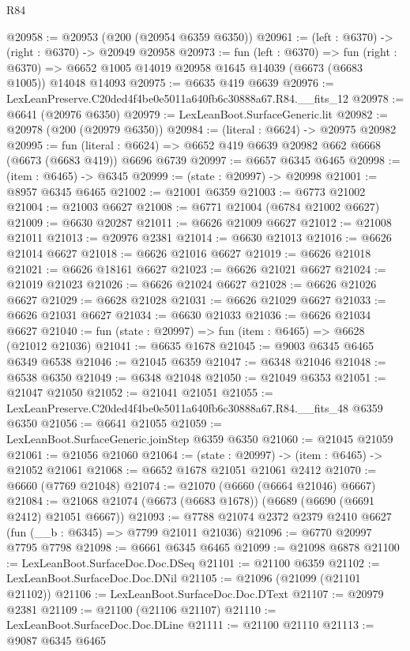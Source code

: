 \begin{lexlean}{R84}
\begin{coremodule}
@20958 := @20953 (@200 (@20954 @6359 @6350))
@20961 := (left : @6370) -> (right : @6370) -> @20949 @20958
@20973 := fun (left : @6370) =>
  fun (right : @6370) => @6652 @1005 @14019 @20958 @1645 @14039 (@6673 (@6683 @1005)) @14048 @14093
@20975 := @6635 @419 @6639
@20976 := LexLeanPreserve.C20ded4f4be0e5011a640fb6c30888a67.R84.__fits_12
@20978 := @6641 (@20976 @6350)
@20979 := LexLeanBoot.SurfaceGeneric.lit
@20982 := @20978 (@200 (@20979 @6350))
@20984 := (literal : @6624) -> @20975 @20982
@20995 := fun (literal : @6624) =>
  @6652 @419 @6639 @20982 @662 @6668 (@6673 (@6683 @419)) @6696 @6739
@20997 := @6657 @6345 @6465
@20998 := (item : @6465) -> @6345
@20999 := (state : @20997) -> @20998
@21001 := @8957 @6345 @6465
@21002 := @21001 @6359
@21003 := @6773 @21002
@21004 := @21003 @6627
@21008 := @6771 @21004 (@6784 @21002 @6627)
@21009 := @6630 @20287
@21011 := @6626 @21009 @6627
@21012 := @21008 @21011
@21013 := @20976 @2381
@21014 := @6630 @21013
@21016 := @6626 @21014 @6627
@21018 := @6626 @21016 @6627
@21019 := @6626 @21018
@21021 := @6626 @18161 @6627
@21023 := @6626 @21021 @6627
@21024 := @21019 @21023
@21026 := @6626 @21024 @6627
@21028 := @6626 @21026 @6627
@21029 := @6628 @21028
@21031 := @6626 @21029 @6627
@21033 := @6626 @21031 @6627
@21034 := @6630 @21033
@21036 := @6626 @21034 @6627
@21040 := fun (state : @20997) => fun (item : @6465) => @6628 (@21012 @21036)
@21041 := @6635 @1678
@21045 := @9003 @6345 @6465 @6349 @6538
@21046 := @21045 @6359
@21047 := @6348 @21046
@21048 := @6538 @6350
@21049 := @6348 @21048
@21050 := @21049 @6353
@21051 := @21047 @21050
@21052 := @21041 @21051
@21055 := LexLeanPreserve.C20ded4f4be0e5011a640fb6c30888a67.R84.__fits_48 @6359 @6350
@21056 := @6641 @21055
@21059 := LexLeanBoot.SurfaceGeneric.joinStep @6359 @6350
@21060 := @21045 @21059
@21061 := @21056 @21060
@21064 := (state : @20997) -> (item : @6465) -> @21052 @21061
@21068 := @6652 @1678 @21051 @21061 @2412
@21070 := @6660 (@7769 @21048)
@21074 := @21070 (@6660 (@6664 @21046) @6667)
@21084 := @21068 @21074 (@6673 (@6683 @1678)) (@6689 (@6690 (@6691 @2412) @21051 @6667))
@21093 := @7788 @21074 @2372 @2379 @2410 @6627 (fun (__b : @6345) => @7799 @21011 @21036)
@21096 := @6770 @20997 @7795 @7798
@21098 := @6661 @6345 @6465
@21099 := @21098 @6878
@21100 := LexLeanBoot.SurfaceDoc.Doc.DSeq
@21101 := @21100 @6359
@21102 := LexLeanBoot.SurfaceDoc.Doc.DNil
@21105 := @21096 (@21099 (@21101 @21102))
@21106 := LexLeanBoot.SurfaceDoc.Doc.DText
@21107 := @20979 @2381
@21109 := @21100 (@21106 @21107)
@21110 := LexLeanBoot.SurfaceDoc.Doc.DLine
@21111 := @21100 @21110
@21113 := @9087 @6345 @6465

\end{coremodule}
\end{lexlean}

